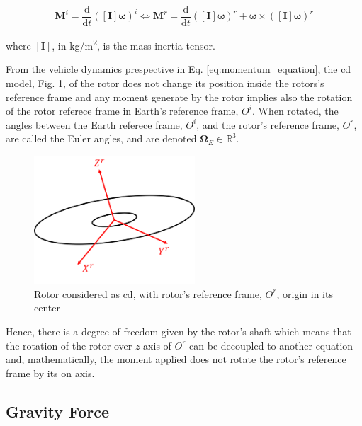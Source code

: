 \begin{equation}
    \mathbf{M}^i = \frac{\mathrm{d}}{\mathrm{d}t} \left( \left[\mathbf{I}\right] \boldsymbol{\omega} \right)^i \Leftrightarrow  \mathbf{M}^r = \frac{\mathrm{d}}{\mathrm{d}t} \left( \left[\mathbf{I}\right] \boldsymbol{\omega} \right)^r + \boldsymbol{\omega} \times \left( \left[\mathbf{I}\right] \boldsymbol{\omega} \right)^r
    \label{eq:momentum_equation}
\end{equation}

\noindent where $\left[\mathbf{I}\right]$, in \unit{kg/m^2}, is the mass inertia tensor. 

From the vehicle dynamics prespective in Eq. \ref{eq:momentum_equation}, the \gls{cd} model, Fig. \ref{fig:rotor_cd}, of the rotor does not change its position inside the rotors's reference frame and any moment generate by the rotor implies also the rotation of the rotor referece frame in Earth's reference frame, $O^i$. When rotated, the angles between the Earth referece frame, $O^i$, and the rotor’s reference frame, $O^r$, are called the Euler angles, and are denoted $\boldsymbol{\Omega}_E \in \mathbb{R}^3$.

\begin{figure}[!htb]
    \centering
    \includegraphics[width=6cm]{Figures/background/rotor_cd.png}
    \caption[Rotor considered as CD, with rotor's reference frame, $O^r$, origin in its center]{Rotor considered as \gls{cd}, with rotor's reference frame, $O^r$, origin in its center}
    \label{fig:rotor_cd}
\end{figure}

Hence, there is a degree of freedom given by the rotor's shaft which means that the rotation of the rotor over $z$-axis of $O^r$ can be decoupled to another equation and, mathematically, the moment applied does not rotate the rotor's reference frame by its on axis.


\subsection{Gravity Force}

